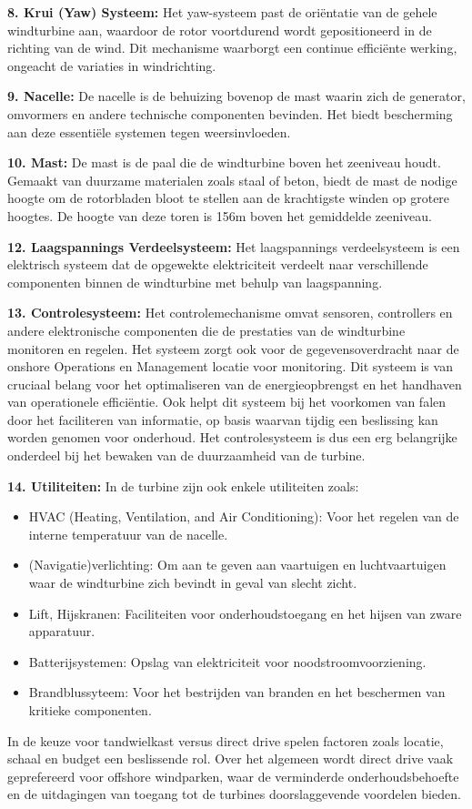 \textbf{8. Krui (Yaw) Systeem:}
Het yaw-systeem past de oriëntatie van de gehele windturbine aan, waardoor de rotor voortdurend wordt gepositioneerd in de richting van de wind. Dit mechanisme waarborgt een continue efficiënte werking, ongeacht de variaties in windrichting.

\textbf{9. Nacelle:}
De nacelle is de behuizing bovenop de mast waarin zich de generator, omvormers en andere technische componenten bevinden. Het biedt bescherming aan deze essentiële systemen tegen weersinvloeden. 

\textbf{10. Mast:}
De mast is de paal die de windturbine boven het zeeniveau houdt. Gemaakt van duurzame materialen zoals staal of beton, biedt de mast de nodige hoogte om de rotorbladen bloot te stellen aan de krachtigste winden op grotere hoogtes. De hoogte van deze toren is 156m boven het gemiddelde zeeniveau. 

\textbf{12. Laagspannings Verdeelsysteem:}
Het laagspannings verdeelsysteem is een elektrisch systeem dat de opgewekte elektriciteit verdeelt naar verschillende componenten binnen de windturbine met behulp van laagspanning.

\textbf{13. Controlesysteem:}
Het controlemechanisme omvat sensoren, controllers en andere elektronische componenten die de prestaties van de windturbine monitoren en regelen. Het systeem zorgt ook voor de gegevensoverdracht naar de onshore Operations en Management locatie voor monitoring. Dit systeem is van cruciaal belang voor het optimaliseren van de energieopbrengst en het handhaven van operationele efficiëntie. Ook helpt dit systeem bij het voorkomen van falen door het faciliteren van informatie, op basis waarvan tijdig een beslissing kan worden genomen voor onderhoud. Het controlesysteem is dus een erg belangrijke onderdeel bij het bewaken van de duurzaamheid van de turbine.

\textbf{14. Utiliteiten:}
In de turbine zijn ook enkele utiliteiten zoals: 
\begin{itemize}
    \item HVAC (Heating, Ventilation, and Air Conditioning): Voor het regelen van de interne temperatuur van de nacelle.
    \item (Navigatie)verlichting: Om aan te geven aan vaartuigen en luchtvaartuigen waar de windturbine zich bevindt in geval van slecht zicht.
    \item Lift, Hijskranen: Faciliteiten voor onderhoudstoegang en het hijsen van zware apparatuur.
    \item Batterijsystemen: Opslag van elektriciteit voor noodstroomvoorziening.
    \item Brandblussyteem: Voor het bestrijden van branden en het beschermen van kritieke componenten.
\end{itemize}


In de keuze voor tandwielkast versus direct drive spelen factoren zoals locatie, schaal en budget een beslissende rol. Over het algemeen wordt direct drive vaak geprefereerd voor offshore windparken, waar de verminderde onderhoudsbehoefte en de uitdagingen van toegang tot de turbines doorslaggevende voordelen bieden.

